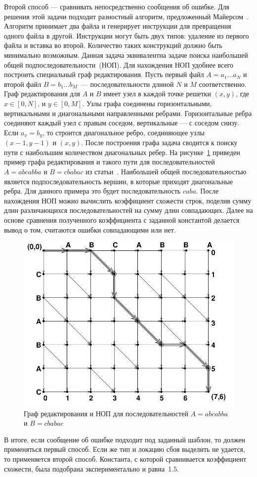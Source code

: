 Второй способ --- сравнивать непосредственно сообщения об ошибке. Для решения этой задачи подходит разностный алгоритм, предложенный Майерсом~\cite{myers1986ano}. Алгоритм принимает два файла и генерирует инструкции для превращения одного файла в другой. Инструкции могут быть двух типов: удаление из первого файла и вставка во второй. Количество таких конструкций должно быть минимально возможным. Данная задача эквивалентна задаче поиска наибольшей общей подпоследовательности~(НОП). Для нахождения НОП удобнее всего построить специальный граф редактирования. Пусть первый файл $A = a_1...a_N$ и второй файл $B = b_1...b_M$~--- последовательности длиной $N$ и $M$ соответственно. Граф редактирования для $A$ и $B$ имеет узел в каждой точке решетки $(x, y)$, где $x \in [0, N]$, и $y \in [0, M]$. Узлы графа соединены горизонтальными, вертикальными и диагональными направленными ребрами. Горизонтальные ребра соединяют каждый узел с правым соседом, вертикальные --- с соседом снизу. Если $a_x = b_y$, то строится диагональное ребро, соединяющее узлы $(x-1, y-1)$ и $(x, y)$. После построения графа задача сводится к поиску пути с наибольшим количеством диагональных ребер.
На рисунке~\ref{ex:lcs} приведен пример графа редактирования и такого пути для последовательностей $A = abcabba$ и $B = cbabac$ из статьи~\cite{myers1986ano}. Наибольшей общей последовательностью является подпоследовательность вершин, в которые приходят диагональные ребра. Для данного примера это будет последовательность $caba$. После нахождения НОП можно вычислить коэффициент схожести строк, поделив сумму длин различающихся последовательностей на сумму длин совпадающих. Далее на основе сравнения полученного коэффициента с заданной константой делается вывод о том, считаются ошибки совпадающими или нет.

\begin{figure}	
		\includegraphics[width=0.99\linewidth]{fig/lcsexample} 
		\caption{\label{ex:lcs}Граф редактирования и НОП для последовательностей $A = abcabba$ и $B = cbabac$}
\end{figure}
В итоге, если сообщение об ошибке подходит под заданный шаблон, то должен применяться первый способ. Если же тип и локацию сбоя выделить не удается, то применяется второй способ. Константа, с которой сравнивается коэффициент схожести, была подобрана экспериментально и равна~1.5.

